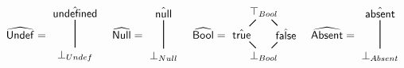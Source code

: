 \[
\abs{Undef} =
\begin{matrix}
  \begin{tikzpicture}
    \node (top) at (0,0) {$\aundef$};
    \node (down) at (0,-1.4) {$\bot_{Undef}$};
    \draw [black, thick, shorten <= -1pt, shorten >=-1pt] (top) -- (down);
  \end{tikzpicture}
\end{matrix}
\quad
\abs{Null} =
\begin{matrix}
  \begin{tikzpicture}
    \node (top) at (0,0) {$\anull$};
    \node (down) at (0,-1.4) {$\bot_{Null}$};
    \draw [black, thick, shorten <= -1pt, shorten >=-1pt] (top) -- (down);
  \end{tikzpicture}
\end{matrix}
\quad
\abs{Bool} =
\begin{matrix}
  \begin{tikzpicture}
    \node (top) at (0,0) {$\top_{Bool}$};
    \node (midleft) at (-0.7,-0.7) {$\atrue$};
    \node (midright) at (0.7,-0.7) {$\afalse$};
    \node (down) at (0,-1.4) {$\bot_{Bool}$};
    \draw [black, thick, shorten <= -1pt, shorten >=-1pt] (top) -- (midleft);
    \draw [black, thick, shorten <= -1pt, shorten >=-1pt] (top) -- (midright);
    \draw [black, thick, shorten <= -1pt, shorten >=-1pt] (midleft) -- (down);
    \draw [black, thick, shorten <= -1pt, shorten >=-1pt] (midright) -- (down);
  \end{tikzpicture}
\end{matrix}
\quad
\abs{Absent} =
\begin{matrix}
  \begin{tikzpicture}
    \node (top) at (0,0) {$\hat{\SF{absent}}$};
    \node (down) at (0,-1.4) {$\bot_{Absent}$};
    \draw [black, thick, shorten <= -1pt, shorten >=-1pt] (top) -- (down);
  \end{tikzpicture}
\end{matrix}
\]
